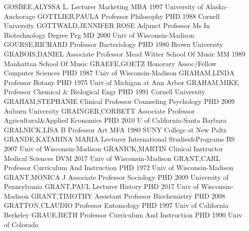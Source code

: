\documentclass[
]{article}
\begin{document}
\textbar GOSBEE,ALYSSA L. \textbar Lecturer \textbar Marketing
\textbar{}  \textbar MBA 1997 University of Alaska-Anchorage
\textbar GOTTLIEB,PAULA \textbar Professor \textbar Philosophy
\textbar{}  \textbar PHD 1988 Cornell University
\textbar GOTTWALD,JENNIFER ROSE \textbar Adjunct Professor \textbar Ms
In Biotechnology Degree Prg \textbar{}  \textbar MD 2000
Univ of Wisconsin-Madison \textbar GOURSE,RICHARD \textbar Professor
\textbar Bacteriology \textbar{}  \textbar PHD 1980 Brown
University \textbar GRABOIS,DANIEL \textbar Associate Professor
\textbar Mead Witter School Of Music \textbar{}  \textbar MM
1989 Manhattan School Of Music \textbar GRAEFE,GOETZ \textbar Honorary
Assoc/Fellow \textbar Computer Sciences \textbar{} 
\textbar PHD 1987 Univ of Wisconsin-Madison \textbar GRAHAM,LINDA
\textbar Professor \textbar Botany \textbar{}  \textbar PHD
1975 Univ of Michigan at Ann Arbor \textbar GRAHAM,MIKE
\textbar Professor \textbar Chemical \& Biological Engr \textbar{}
 \textbar PHD 1991 Cornell University
\textbar GRAHAM,STEPHANIE \textbar Clinical Professor
\textbar Counseling Psychology \textbar{}  \textbar PHD 2009
Auburn University \textbar GRAINGER,CORBETT \textbar Associate Professor
\textbar Agricultural\&Applied Economics \textbar{} 
\textbar PHD 2010 U of California-Santa Barbara \textbar GRALNICK,LISA B
\textbar Professor \textbar Art \textbar{}  \textbar MFA
1980 SUNY College at New Paltz \textbar GRANDE,KATARINA MARIA
\textbar Lecturer \textbar International Studies\&Programs \textbar{}
 \textbar BS 2007 Univ of Wisconsin-Madison
\textbar GRANICK,MARTIN \textbar Clinical Instructor \textbar Medical
Sciences \textbar{}  \textbar DVM 2017 Univ of
Wisconsin-Madison \textbar GRANT,CARL \textbar Professor
\textbar Curriculum And Instruction \textbar{}  \textbar PHD
1972 Univ of Wisconsin-Madison \textbar GRANT,MONICA J
\textbar Associate Professor \textbar Sociology \textbar{} 
\textbar PHD 2009 University of Pennsylvania \textbar GRANT,PAUL
\textbar Lecturer \textbar History \textbar{}  \textbar PHD
2017 Univ of Wisconsin-Madison \textbar GRANT,TIMOTHY \textbar Assistant
Professor \textbar Biochemistry \textbar{}  \textbar PHD
2008 \textbar GRATTON,CLAUDIO \textbar Professor \textbar Entomology
\textbar{}  \textbar PHD 1997 Univ of California Berkeley
\textbar GRAUE,BETH \textbar Professor \textbar Curriculum And
Instruction \textbar{}  \textbar PHD 1990 Univ of Colorado
\end{document}
